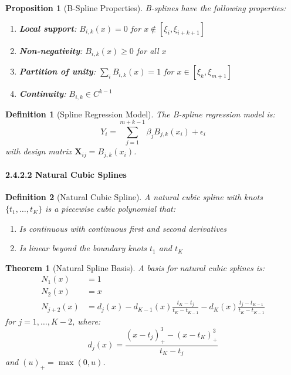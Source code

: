 \documentclass{article}
\newtheorem{definition}{Definition}
\newtheorem{theorem}{Theorem}
\newtheorem{proposition}{Proposition}
\begin{document}
\begin{proposition}[B-Spline Properties]
B-splines have the following properties:
\begin{enumerate}
    \item \textbf{Local support}: $B_{i,k}(x) = 0$ for $x \notin [\xi_i, \xi_{i+k+1}]$
    \item \textbf{Non-negativity}: $B_{i,k}(x) \geq 0$ for all $x$
    \item \textbf{Partition of unity}: $\sum_i B_{i,k}(x) = 1$ for $x \in [\xi_k, \xi_{m+1}]$
    \item \textbf{Continuity}: $B_{i,k} \in C^{k-1}$
\end{enumerate}
\end{proposition}

\begin{definition}[Spline Regression Model]
The B-spline regression model is:
\begin{equation}
Y_i = \sum_{j=1}^{m+k-1} \beta_j B_{j,k}(x_i) + \epsilon_i
\end{equation}
with design matrix $\mathbf{X}_{ij} = B_{j,k}(x_i)$.
\end{definition}

\paragraph{2.4.2.2 Natural Cubic Splines}

\begin{definition}[Natural Cubic Spline]
A natural cubic spline with knots $\{t_1, \ldots, t_K\}$ is a piecewise cubic polynomial that:
\begin{enumerate}
    \item Is continuous with continuous first and second derivatives
    \item Is linear beyond the boundary knots $t_1$ and $t_K$
\end{enumerate}
\end{definition}

\begin{theorem}[Natural Spline Basis]
A basis for natural cubic splines is:
\begin{align}
N_1(x) &= 1 \\
N_2(x) &= x \\
N_{j+2}(x) &= d_j(x) - d_{K-1}(x)\frac{t_K - t_j}{t_K - t_{K-1}} - d_K(x)\frac{t_j - t_{K-1}}{t_K - t_{K-1}}
\end{align}
for $j = 1, \ldots, K-2$, where:
\begin{equation}
d_j(x) = \frac{(x - t_j)_+^3 - (x - t_K)_+^3}{t_K - t_j}
\end{equation}
and $(u)_+ = \max(0, u)$.
\end{theorem}
\end{document}
